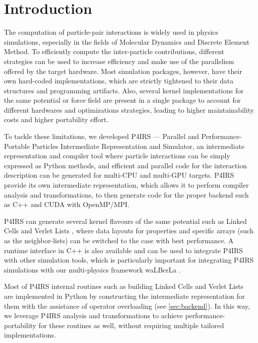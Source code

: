 \documentclass[preprint,12pt]{elsarticle}
\begin{document}

\section{Introduction}
\label{sec:introduction}

The computation of particle-pair interactions is widely used in physics simulations, especially in the fields of Molecular Dynamics and Discrete Element Method.
To efficiently compute the inter-particle contributions, different strategies can be used to increase efficiency and make use of the parallelism offered by the target hardware.
Most simulation packages, however, have their own hard-coded implementations, which are strictly tightened to their data structures and programming artifacts.
Also, several kernel implementations for the same potential or force field are present in a single package to account for different hardwares and optimizations strategies, leading to higher maintainability costs and higher portability effort.

To tackle these limitations, we developed P4IRS --- Parallel and Performance-Portable Particles Intermediate Representation and Simulator, an intermediate representation and compiler tool where particle interactions can be simply expressed as Python methods, and efficient and parallel code for the interaction description can be generated for multi-CPU and multi-GPU targets.
P4IRS provide its own intermediate representation, which allows it to perform compiler analysis and transformations, to then generate code for the proper backend such as C++ and CUDA with OpenMP/MPI.

P4IRS can generate several kernel flavours of the same potential such as Linked Cells \cite{linkedcells} and Verlet Lists \cite{verletlists}, where data layouts for properties and specific arrays (such as the neighbor-lists) can be switched to the case with best performance.
A runtime interface in C++ is also available and can be used to integrate P4IRS with other simulation tools, which is particularly important for integrating P4IRS simulations with our multi-physics framework waLBerLa \cite{walberla1,walberla2}.

Most of P4IRS internal routines such as building Linked Cells and Verlet Lists are implemented in Python by constructing the intermediate representation for them with the assistance of operator overloading (see \autoref{sec:backend}).
In this way, we leverage P4IRS analysis and transformations to achieve performance-portability for these routines as well, without requiring multiple tailored implementations.
\end{document}

